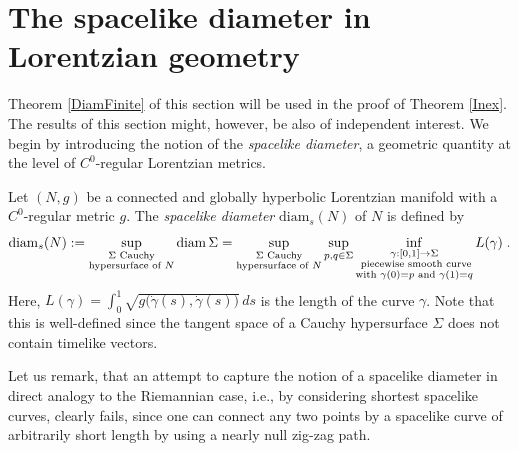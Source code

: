 \documentclass[reqno]{article}
\newcommand{\diam}{\mathrm{diam}}
\begin{document}
\section{The spacelike diameter in Lorentzian geometry}
\label{SecDiam}

Theorem \ref{DiamFinite} of this section will be used in the proof of Theorem \ref{Inex}. The results of this section might, however, be also of independent interest. We begin by introducing the notion of the \emph{spacelike diameter}, a geometric quantity at the level of $C^0$-regular Lorentzian metrics.

\begin{definition}
Let $(N,g)$ be a connected  and globally hyperbolic Lorentzian manifold with a $C^0$-regular metric $g$. The \emph{spacelike diameter}  $\diam_s(N)$ of $N$ is defined by 
\begin{equation*}
\diam_s(N) := \sup_{\substack{\Sigma \textnormal{ Cauchy} \\ \textnormal{hypersurface of } N}} \diam\, \Sigma = \sup_{\substack{\Sigma \textnormal{ Cauchy} \\  \textnormal{hypersurface of } N}} \sup_{p,q \in \Sigma} \inf_{\substack{\gamma : [0,1] \to \Sigma \\ \textnormal{ piecewise smooth curve} \\  \textnormal{with } \gamma(0) = p \textnormal{ and } \gamma(1) = q}} L(\gamma)\;.
\end{equation*}
Here, $L(\gamma) = \int_0^1 \sqrt{g\big(\dot{\gamma}(s), \dot{\gamma}(s)\big)} \, ds $ is the length of the curve $\gamma$. Note that this is well-defined since the tangent space of a Cauchy hypersurface $\Sigma$ does not contain timelike vectors.
\end{definition}

Let us remark, that an attempt to capture the notion of a spacelike diameter in direct analogy to the Riemannian case, i.e., by considering shortest spacelike curves, clearly fails, since one can connect any two points by a spacelike curve of arbitrarily short length by using a nearly null zig-zag path. 
\end{document}
